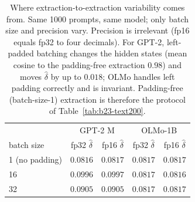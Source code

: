 \begin{table}[H]
\centering
\small
\begin{tabular}{lcc|cc}
\toprule
& \multicolumn{2}{c|}{GPT-2 M} & \multicolumn{2}{c}{OLMo-1B} \\
batch size & fp32 $\hat\delta$ & fp16 $\hat\delta$ & fp32 $\hat\delta$ & fp16 $\hat\delta$ \\
\midrule
1 (no padding) & $0.0816$ & $0.0817$ & $0.0817$ & $0.0817$ \\
16 & $0.0996$ & $0.0997$ & $0.0817$ & $0.0816$ \\
32 & $0.0905$ & $0.0905$ & $0.0817$ & $0.0817$ \\
\bottomrule
\end{tabular}
\caption{Where extraction-to-extraction variability comes from. Same 1000 prompts, same model; only batch size and precision vary. Precision is irrelevant (fp16 equals fp32 to four decimals). For GPT-2, left-padded batching changes the hidden states (mean cosine to the padding-free extraction $0.98$) and moves $\hat\delta$ by up to $0.018$; OLMo handles left padding correctly and is invariant. Padding-free (batch-size-1) extraction is therefore the protocol of Table~\ref{tab:b23-text200}.}
\label{tab:b28-extraction}
\end{table}
